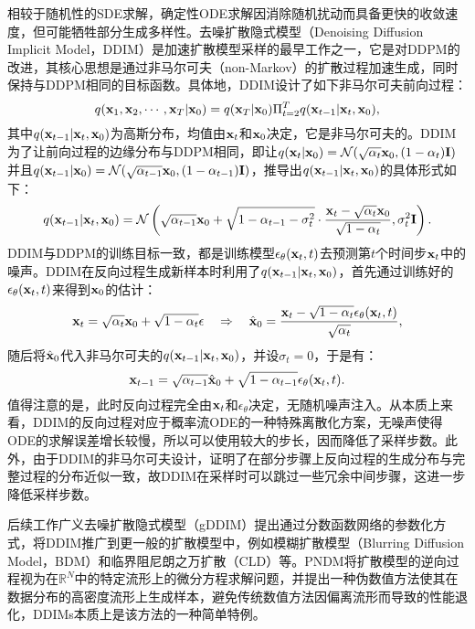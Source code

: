 \documentclass[11pt,a4paper,UTF8]{ctexart}
\begin{document}
相较于随机性的SDE求解，确定性ODE求解因消除随机扰动而具备更快的收敛速度，但可能牺牲部分生成多样性。去噪扩散隐式模型（Denoising Diffusion Implicit Model，DDIM）\cite{song2020denoising}是加速扩散模型采样的最早工作之一，它是对DDPM的改进，其核心思想是通过非马尔可夫（non-Markov）的扩散过程加速生成，同时保持与DDPM相同的目标函数。具体地，DDIM设计了如下非马尔可夫前向过程：
\begin{equation*}
    q(\mathbf{x}_1,\mathbf{x}_2,\cdots,\mathbf{x}_T|\mathbf{x}_0)=q(\mathbf{x}_T|\mathbf{x}_0)\Pi_{t=2}^T q(\mathbf{x}_{t-1}|\mathbf{x}_t,\mathbf{x}_0),
\end{equation*}
其中$q(\mathbf{x}_{t-1}|\mathbf{x}_t,\mathbf{x}_0)$为高斯分布，均值由$\mathbf{x}_t$和$\mathbf{x}_0$决定，它是非马尔可夫的。DDIM为了让前向过程的边缘分布与DDPM相同，即让$q(\mathbf{x}_t|\mathbf{x}_0)=\mathcal{N}(\sqrt{\alpha_t}\mathbf{x}_0,(1-\alpha_t)\mathbf{I})$并且$q(\mathbf{x}_{t-1}|\mathbf{x}_0)=\mathcal{N}(\sqrt{\alpha_{t-1}}\mathbf{x}_0,(1-\alpha_{t-1})\mathbf{I})$，推导出$q(\mathbf{x}_{t-1}|\mathbf{x}_t,\mathbf{x}_0)$的具体形式如下：
\begin{equation*}
    q(\mathbf{x}_{t-1}|\mathbf{x}_t,\mathbf{x}_0) = \mathcal{N}\left(\sqrt{\alpha_{t-1}}\mathbf{x}_0 + \sqrt{1-\alpha_{t-1}-\sigma_t^2}\cdot\frac{\mathbf{x}_t-\sqrt{\alpha_t}\mathbf{x}_0}{\sqrt{1-\alpha_t}},\sigma_t^2\mathbf{I} \right).
\end{equation*}
DDIM与DDPM的训练目标一致，都是训练模型$\epsilon_\theta(\mathbf{x}_t,t)$去预测第$t$个时间步$\mathbf{x}_t$中的噪声。DDIM在反向过程生成新样本时利用了$q(\mathbf{x}_{t-1}|\mathbf{x}_t,\mathbf{x}_0)$，首先通过训练好的$\epsilon_\theta(\mathbf{x}_t,t)$来得到$\mathbf{x}_0$的估计：
\begin{equation*}
    \mathbf{x}_t = \sqrt{\alpha_t}\mathbf{x}_0 + \sqrt{1-\alpha_t}\epsilon\quad \Rightarrow\quad \hat{\mathbf{x}}_0 = \frac{\mathbf{x}_t - \sqrt{1-\alpha_t}\epsilon_\theta(\mathbf{x}_t,t)}{\sqrt{\alpha_t}},
\end{equation*}
随后将$\hat{\mathbf{x}}_0$代入非马尔可夫的$q(\mathbf{x}_{t-1}|\mathbf{x}_t,\mathbf{x}_0)$，并设$\sigma_t=0$，于是有：
\begin{equation*}
    \mathbf{x}_{t-1}=\sqrt{\alpha_{t-1}} \hat{\mathbf{x}}_0 + \sqrt{1-\alpha_{t-1}}\epsilon_\theta(\mathbf{x}_t,t).
\end{equation*}
值得注意的是，此时反向过程完全由$\mathbf{x}_t$和$\epsilon_\theta$决定，无随机噪声注入。从本质上来看，DDIM的反向过程对应于概率流ODE的一种特殊离散化方案，无噪声使得ODE的求解误差增长较慢，所以可以使用较大的步长，因而降低了采样步数。此外，由于DDIM的非马尔可夫设计，\cite{song2020denoising}证明了在部分步骤上反向过程的生成分布与完整过程的分布近似一致，故DDIM在采样时可以跳过一些冗余中间步骤，这进一步降低采样步数。

后续工作广义去噪扩散隐式模型（gDDIM）\cite{zhang2022gddim}提出通过分数函数网络的参数化方式，将DDIM推广到更一般的扩散模型中，例如模糊扩散模型（Blurring Diffusion Model，BDM）\cite{Hoogeboom2023blurring}和临界阻尼朗之万扩散（CLD）\cite{dockhorn2021score}等。PNDM\cite{liu2021pseudo}将扩散模型的逆向过程视为在$\mathbb{R}^N$中的特定流形上的微分方程求解问题，并提出一种伪数值方法使其在数据分布的高密度流形上生成样本，避免传统数值方法因偏离流形而导致的性能退化，DDIMs本质上是该方法的一种简单特例。
\end{document}
